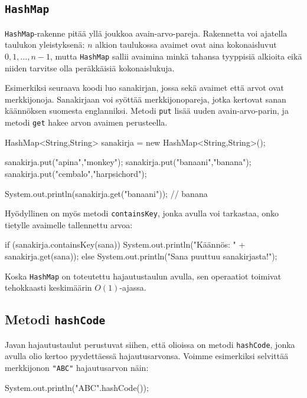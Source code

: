 \subsection{\texttt{HashMap}}

\texttt{HashMap}-rakenne pitää yllä joukkoa avain-arvo-pareja.
Rakennetta voi ajatella taulukon yleistyksenä:
$n$ alkion taulukossa avaimet ovat aina kokonaisluvut
$0,1,\ldots,n-1$, mutta \texttt{HashMap} sallii
avaimina minkä tahansa tyyppisiä alkioita eikä niiden
tarvitse olla peräkkäisiä kokonaislukuja.

Esimerkiksi seuraava koodi luo sanakirjan, jossa sekä
avaimet että arvot ovat merkkijonoja.
Sanakirjaan voi syöttää merkkijonopareja, jotka kertovat
sanan käännöksen suomesta englanniksi.
Metodi \texttt{put} lisää uuden avain-arvo-parin,
ja metodi \texttt{get} hakee arvon avaimen perusteella.

\begin{code}
HashMap<String,String> sanakirja = new HashMap<String,String>();

sanakirja.put("apina","monkey");
sanakirja.put("banaani","banana");
sanakirja.put("cembalo","harpsichord");

System.out.println(sanakirja.get("banaani")); // banana
\end{code}

Hyödyllinen on myös metodi \texttt{containsKey},
jonka avulla voi tarkastaa, onko tietylle avaimelle
tallennettu arvoa:

\begin{code}
if (sanakirja.containsKey(sana)) {
    System.out.println("Käännös: " + sanakirja.get(sana));
} else {
    System.out.println("Sana puuttuu sanakirjasta!");
}
\end{code}

Koska \texttt{HashMap} on toteutettu hajautustaulun avulla,
sen operaatiot toimivat tehokkaasti keskimäärin $O(1)$-ajassa.

\subsection{Metodi \texttt{hashCode}}

Javan hajautustaulut perustuvat siihen, että olioissa
on metodi \texttt{hashCode}, jonka avulla olio kertoo
pyydettäessä hajautusarvonsa.
Voimme esimerkiksi selvittää merkkijonon \texttt{"ABC"}
hajautusarvon näin:

\begin{code}
System.out.println("ABC".hashCode());
\end{code}


